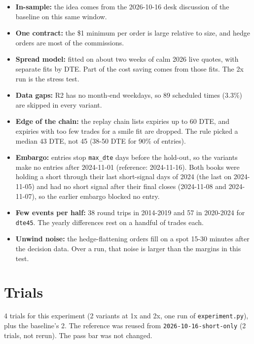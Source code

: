 \documentclass{article}
\begin{document}
\begin{itemize}

\item \textbf{In-sample:} the idea comes from the 2026-10-16 desk discussion of the baseline on this same window.

\item \textbf{One contract:} the \$1 minimum per order is large relative to size, and hedge orders are most of the commissions.

\item \textbf{Spread model:} fitted on about two weeks of calm 2026 live quotes, with separate fits by DTE. Part of the cost saving comes from those fits. The 2x run is the stress test.

\item \textbf{Data gaps:} R2 has no month-end weekdays, so 89 scheduled times (3.3\%) are skipped in every variant.

\item \textbf{Edge of the chain:} the replay chain lists expiries up to 60 DTE, and expiries with too few trades for a smile fit are dropped. The rule picked a median 43 DTE, not 45 (38-50 DTE for 90\% of entries).

\item \textbf{Embargo:} entries stop \texttt{max\_\allowbreak{}dte} days before the hold-out, so the variants make no entries after 2024-11-01 (reference: 2024-11-16). Both books were holding a short through their last short-signal days of 2024 (the last on 2024-11-05) and had no short signal after their final closes (2024-11-08 and 2024-11-07), so the earlier embargo blocked no entry.

\item \textbf{Few events per half:} 38 round trips in 2014-2019 and 57 in 2020-2024 for \texttt{dte45}. The yearly differences rest on a handful of trades each.

\item \textbf{Unwind noise:} the hedge-flattening orders fill on a spot 15-30 minutes after the decision data. Over a run, that noise is larger than the margins in this test.

\end{itemize}

\section{Trials}

4 trials for this experiment (2 variants at 1x and 2x, one run of \texttt{experiment.\allowbreak{}py}), plus the baseline's 2. The reference was reused from \texttt{2026-\allowbreak{}10-\allowbreak{}16-\allowbreak{}short-\allowbreak{}only} (2 trials, not rerun). The pass bar was not changed.
\end{document}

